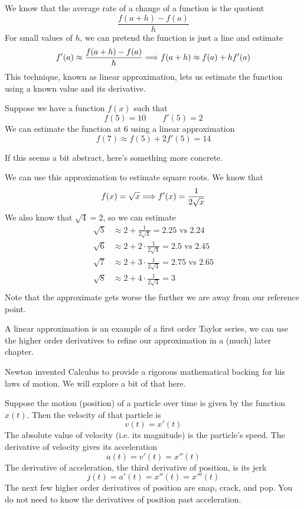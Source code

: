 We know that the average rate of a change of a function is the quotient
\[ \frac{f(a + h) - f(a)}{h} \]
For small values of $h$, we can pretend the function is just a line and estimate
\[ f'(a) \approx \frac{f(a + h) - f(a)}{h} \Longrightarrow f(a + h) \approx f(a) + h f'(a) \]
This technique, known as linear approximation, lets us estimate the function using a known value and its derivative. 

\begin{example}
	Suppose we have a function $f(x)$ such that
	\[ f(5) = 10 \qquad f'(5) = 2 \]
	We can estimate the function at 6 using a linear approximation
	\[ f(7) \approx f(5) + 2f'(5) = 14 \]
\end{example}

If this seems a bit abstract, here's something more concrete.

\begin{example}
	We can use this approximation to estimate square roots. We know that 
	\[ f(x) = \sqrt{x} \Longrightarrow f'(x) = \frac{1}{2\sqrt{x}} \]
	We also know that $\sqrt{4} = 2$, so we can estimate
	\begin{align*}
		\sqrt{5} &\approx 2 + \frac{1}{2\sqrt{4}} =  2.25 \text{ vs } 2.24\\
		\sqrt{6} &\approx 2 + 2 \cdot \frac{1}{2\sqrt{4}} =  2.5 \text{ vs } 2.45 \\
		\sqrt{7} &\approx 2 + 3 \cdot \frac{1}{2\sqrt{4}} =  2.75 \text{ vs } 2.65 \\
		\sqrt{8} &\approx 2 + 4 \cdot \frac{1}{2\sqrt{4}} =  3 \\
	\end{align*}
	Note that the approximate gets worse the further we are away from our reference point. 
\end{example}

A linear approximation is an example of a first order Taylor series, we can use the higher order derivatives to refine our approximation in a (much) later chapter.

Newton invented Calculus to provide a rigorous mathematical backing for his laws of motion. We will explore a bit of that here. 

\begin{definition}
	Suppose the motion (position) of a particle over time is given by the function $x(t)$. Then the velocity of that particle is
	\[ v(t) = x'(t) \]
	The absolute value of velocity (i.e. its magnitude) is the particle's speed. The derivative of velocity gives its acceleration
	\[ a(t) = v'(t) = x''(t) \]
	The derivative of acceleration, the third derivative of position, is its jerk
	\[ j(t) = a'(t) = x''(t) = x'''(t) \]
	The next few higher order derivatives of position are snap, crack, and pop. You do not need to know the derivatives of position past acceleration.
\end{definition}

